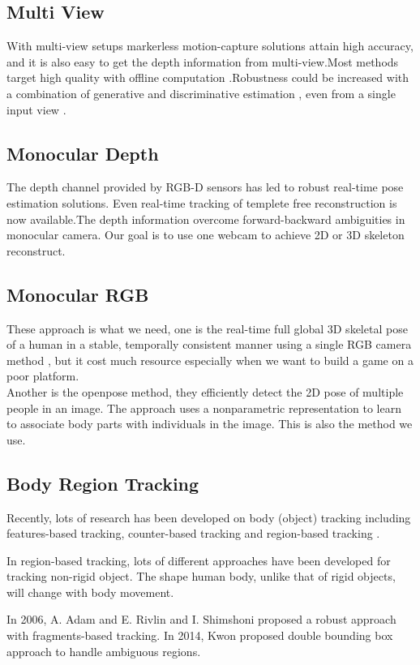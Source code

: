 \documentclass[11pt,twocolumn,letterpaper]{article}
\begin{document}
  \subsection{Multi View}
  With multi-view setups markerless motion-capture solutions attain high accuracy, and it is also easy to get the depth information from multi-view.Most methods target high quality with offline computation \cite{Loper2014}\cite{twist}.Robustness could be increased with a combination of generative and discriminative estimation \cite{7299005}, even from a single input view \cite{Rosales2006}.
  \subsection{Monocular Depth}
  The depth channel provided by RGB-D sensors has led to robust real-time pose estimation solutions\cite{6126356}\cite{7457693}. Even real-time tracking of templete free reconstruction is now available\cite{Dou:2016:FRP:2897824.2925969}.The depth information overcome forward-backward  ambiguities in monocular camera. Our goal is to use one webcam to achieve 2D or 3D skeleton reconstruct.
  \subsection{Monocular RGB}
  These approach is what we need, one is the real-time  full global 3D skeletal pose of a human in a stable, temporally consistent manner using a single RGB camera method \cite{VNect_SIGGRAPH2017}, but it cost much resource especially when we want to build a game on a poor platform.\\
  Another is the openpose method\cite{cao2017realtime}\cite{wei2016cpm}, they efficiently detect the 2D pose of multiple people in an image. The approach uses a nonparametric representation to learn to associate body parts with individuals in the image. This is also the method we use.
  \subsection{Body Region Tracking}
  Recently, lots of research has been developed on body (object) tracking including features-based tracking, counter-based tracking \cite{panin2006efficient} and region-based tracking \cite{1640835}.
  \par
  In region-based tracking, lots of different approaches have been developed for tracking non-rigid object. The shape human body, unlike that of rigid objects, will change with body movement. 
  \par
  In 2006, A. Adam and E. Rivlin and I. Shimshoni proposed a robust approach with fragments-based tracking. In 2014, Kwon proposed double bounding box approach to handle ambiguous regions. \cite{Kwon2014}
\end{document}

